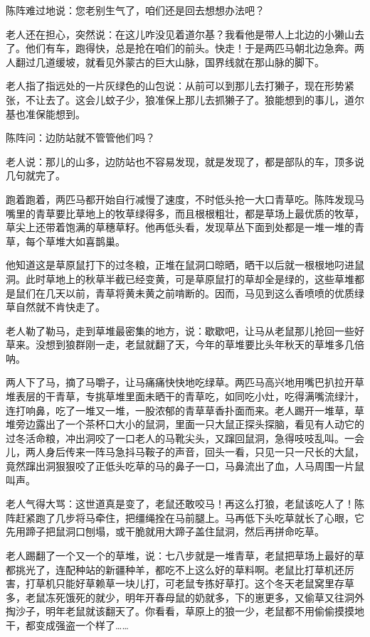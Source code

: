 \par 陈阵难过地说：您老别生气了，咱们还是回去想想办法吧？
\par 老人还在担心，突然说：在这儿咋没见着道尔基？我看他是带人上北边的小獭山去了。他们有车，跑得快，总是抢在咱们的前头。快走！于是两匹马朝北边急奔。两人翻过几道缓坡，就看见外蒙古的巨大山脉，国界线就在那山脉的脚下。
\par 老人指了指远处的一片灰绿色的山包说：从前可以到那儿去打獭子，现在形势紧张，不让去了。这会儿蚊子少，狼准保上那儿去抓獭子了。狼能想到的事儿，道尔基也准保能想到。
\par 陈阵问：边防站就不管管他们吗？
\par 老人说：那儿的山多，边防站也不容易发现，就是发现了，都是部队的车，顶多说几句就完了。
\par 跑着跑着，两匹马都开始自行减慢了速度，不时低头抢一大口青草吃。陈阵发现马嘴里的青草要比草地上的牧草绿得多，而且根根粗壮，都是草场上最优质的牧草，草尖上还带着饱满的草穗草籽。他再低头看，发现草丛下面到处都是一堆一堆的青草，每个草堆大如喜鹊巢。
\par 他知道这是草原鼠打下的过冬粮，正堆在鼠洞口晾晒，晒干以后就一根根地叼进鼠洞。此时草地上的秋草半截已经变黄，可是草原鼠打的草却全是绿的，这些草堆都是鼠们在几天以前，青草将黄未黄之前啃断的。因而，马见到这么香喷喷的优质绿草自然就不肯快走了。
\par 老人勒了勒马，走到草堆最密集的地方，说：歇歇吧，让马从老鼠那儿抢回一些好草来。没想到狼群刚一走，老鼠就翻了天，今年的草堆要比头年秋天的草堆多几倍呐。
\par 两人下了马，摘了马嚼子，让马痛痛快快地吃绿草。两匹马高兴地用嘴巴扒拉开草堆表层的干青草，专挑草堆里面未晒干的青草吃，如同吃小灶，吃得满嘴流绿汁，连打响鼻，吃了一堆又一堆，一股浓郁的青草草香扑面而来。老人踢开一堆草，草堆旁边露出了一个茶杯口大小的鼠洞，里面一只大鼠正探头探脑，看见有人动它的过冬活命粮，冲出洞咬了一口老人的马靴尖头，又蹿回鼠洞，急得吱吱乱叫。一会儿，两人身后传来一阵马急抖马鞍子的声音，回头一看，只见一只一尺长的大鼠，竟然蹿出洞狠狠咬了正低头吃草的马的鼻子一口，马鼻流出了血，人马周围一片鼠叫声。
\par 老人气得大骂：这世道真是变了，老鼠还敢咬马！再这么打狼，老鼠该吃人了！陈阵赶紧跑了几步将马牵住，把缰绳拴在马前腿上。马再低下头吃草就长了心眼，它先用蹄子把鼠洞口刨塌，或干脆就用大蹄子盖住鼠洞，然后再拼命吃草。
\par 老人踢翻了一个又一个的草堆，说：七八步就是一堆青草，老鼠把草场上最好的草都挑光了，连配种站的新疆种羊，都吃不上这么好的草料啊。老鼠比打草机还厉害，打草机只能好草赖草一块儿打，可老鼠专拣好草打。这个冬天老鼠窝里存草多，老鼠冻死饿死的就少，明年开春母鼠的奶就多，下的崽更多，又偷草又往洞外掏沙子，明年老鼠就该翻天了。你看看，草原上的狼一少，老鼠都不用偷偷摸摸地干，都变成强盗一个样了……

